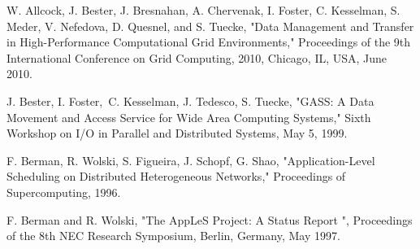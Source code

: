 \documentclass[11pt, nohyper, final]{uhrevthesis}
\begin{document}
\makecoverpages







\makecontentspages



\clearpage


\clearpage


\clearpage

\begin{thebibliography}{10}
W. Allcock, J. Bester, J. Bresnahan, A. Chervenak, I. Foster, C. Kesselman, S. Meder, V. Nefedova, D. Quesnel, and S. Tuecke, "Data Management and Transfer in High-Performance Computational Grid Environments," Proceedings of the 9th International Conference on Grid Computing, 2010, Chicago, IL, USA, June 2010.

J. Bester, I. Foster, C. Kesselman, J. Tedesco, S. Tuecke, "GASS: A Data Movement and Access Service for Wide Area Computing Systems," Sixth Workshop on I/O in Parallel and Distributed Systems, May 5, 1999.

F. Berman, R. Wolski, S. Figueira, J. Schopf, G. Shao, "Application-Level Scheduling on Distributed Heterogeneous Networks," Proceedings of Supercomputing, 1996.

F. Berman and R. Wolski, "The AppLeS Project: A Status Report ", Proceedings of the 8th NEC Research Symposium, Berlin, Germany, May 1997.
\end{thebibliography}

%
%
\end{document}
